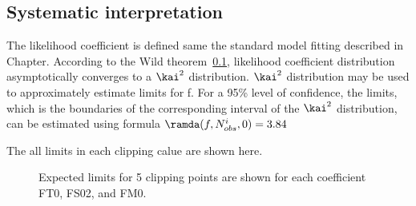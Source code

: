 \subsection{Systematic interpretation}

The likelihood coefficient is defined same the standard model fitting described in Chapter{}.
According to the Wild theorem~\ref{}, likelihood coefficient distribution asymptotically converges to a $\kai^2$ distribution. 
$\kai^2$ distribution may be used to approximately estimate limits for f.
For a 95\% level of confidence, the limits, which is the boundaries of the corresponding interval of the $\kai^2$ distribution, can be estimated using formula
$
\ramda(f,N^i_{obs},0) = 3.84
$

The all limits in each clipping calue are shown here.

\begin{figure}[ht]
    \centering
        \caption{Expected limits for 5 clipping points are shown for each coefficient FT0, FS02, and FM0.}
        \label{fig:ClippedLimits}
\end{figure}

